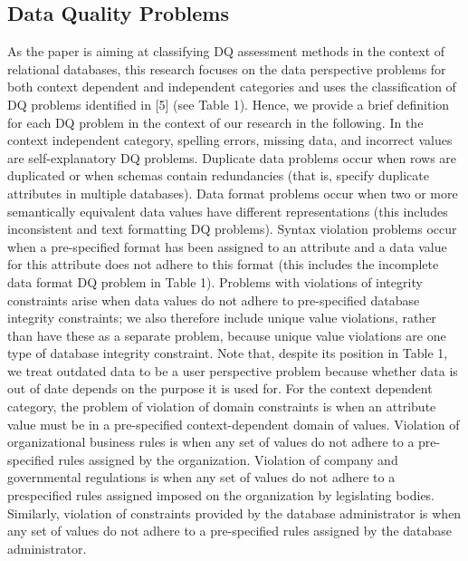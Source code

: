 \documentclass[pdftex,english,oribibl]{llncs}
\begin{document}
    \subsection{Data Quality Problems}
    As the paper is aiming at classifying DQ assessment methods in the context of relational databases, this
    research focuses on the data perspective problems for both context dependent and independent categories and uses the classification of DQ problems identified in [5] (see Table 1).
    Hence, we provide a brief definition for each DQ problem in the context of our research in the following.
    In the context independent category, spelling errors, missing data, and incorrect values are self-explanatory DQ problems.
    Duplicate data problems occur when rows are duplicated or when schemas contain redundancies (that is, specify duplicate attributes in multiple databases).
    Data format problems occur when two or more semantically equivalent data values have different representations (this includes inconsistent and text formatting DQ problems).
    Syntax violation problems occur when a pre-specified format has been assigned to an attribute and a data value for this attribute does not adhere to this format (this includes the incomplete data format DQ problem in Table 1).
    Problems with violations of integrity constraints arise when data values do not adhere to pre-specified database integrity constraints; we also therefore include unique value violations, rather than have these as a separate problem, because unique value violations are one type of database integrity constraint.
    Note that, despite its position in Table 1, we treat outdated data to be a user perspective problem because whether data is out of date depends on the purpose it is used for.
    For the context dependent category, the problem of violation of domain constraints is when an attribute value must be in a pre-specified context-dependent domain of values.
    Violation of organizational business rules is when any set of values do not adhere to a pre-specified rules assigned by the organization.
    Violation of company and governmental regulations is when any set of values do not adhere to a prespecified rules assigned imposed on the organization by legislating bodies.
    Similarly, violation of constraints provided by the database administrator is when any set of values do not adhere to a pre-specified rules assigned by the database administrator.
\end{document}
